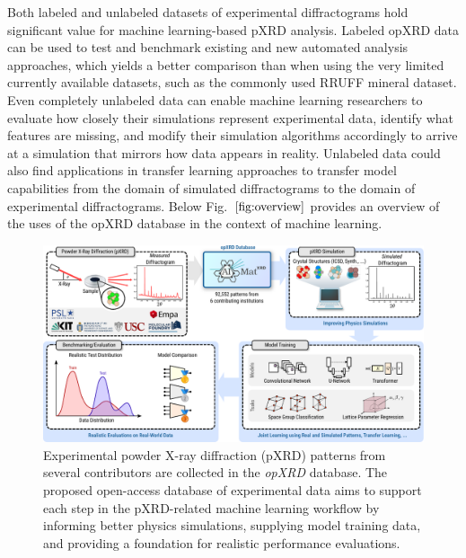Both labeled and unlabeled datasets of experimental diffractograms hold significant value for machine learning-based pXRD analysis. Labeled opXRD data can be used to test and benchmark existing and new automated analysis approaches, which yields a better comparison than when using the very limited currently available datasets, such as the commonly used RRUFF mineral dataset\cite{Armbruster2015}. Even completely unlabeled data can enable machine learning researchers to evaluate how closely their simulations represent experimental data, identify what features are missing, and modify their simulation algorithms accordingly to arrive at a simulation that mirrors how data appears in reality. Unlabeled data could also find applications in transfer learning approaches to transfer model capabilities from the domain of simulated diffractograms to the domain of experimental diffractograms. Below Fig.~$\eqref{fig:overview}$ provides an overview of the uses of the opXRD database in the context of machine learning. \\

\begin{figure}[!htb]
    \centering
    \includegraphics[width=1.0\linewidth]{figures/pipeline.pdf}
    \caption{Experimental powder X-ray diffraction (pXRD) patterns from several contributors are collected in the \textit{opXRD} database. The proposed open-access database of experimental data aims to support each step in the pXRD-related machine learning workflow by informing better physics simulations, supplying model training data, and providing a foundation for realistic performance evaluations.}
    \label{fig:overview}
\end{figure}

